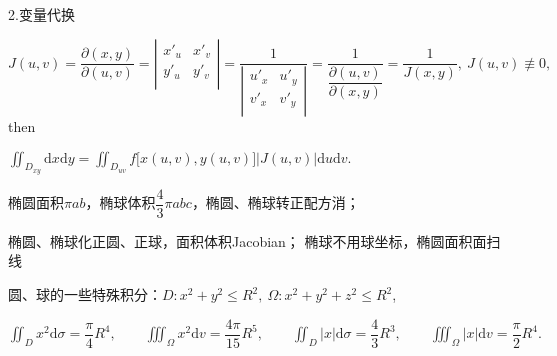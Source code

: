 \documentclass[UTF8]{ctexart}
\newcommand\dif{\mathrm{d}}
\newcommand\no{\noindent}
\newcommand\dis{\displaystyle}
\newcommand\ls{\leqslant}
\begin{document}
\begin{spacing}{2}
\begin{enumerate}[itemindent=1.4em, label=(\arabic*)]
\end{enumerate}

\no2.变量代换

$\dis J(u,v)=\dfrac{\partial(x,y)}{\partial(u,v)}=
\left|\begin{array}{cc} 
    x'_u &    x'_v\\ 
    y'_u &    y'_v\\  
\end{array}\right|
=\dfrac{1}
{\left|\begin{array}{cc} 
    u'_x &    u'_y\\ 
    v'_x &    v'_y\\  
\end{array}\right|}
=\dfrac{1}{\dfrac{\partial(u,v)}{\partial(x,y)}}
=\dfrac{1}{J(x,y)},\ 
 J(u,v)\not\equiv0,\ $then

\vspace{0.2cm}

\centerline{$\dis\iint_{D_{xy}}\dif x\dif y
=\iint_{D_{uv}}f\big[x(u,v),y(u,v)\big]\big|J(u,v)\big|\dif u\dif v.$}


%

\vspace{0.3cm}

椭圆面积$\pi ab$，椭球体积$\dfrac{4}{3}\pi abc$，椭圆、椭球转正配方消；

椭圆、椭球化正圆、正球，面积体积Jacobian；
椭球不用球坐标，椭圆面积面扫线

圆、球的一些特殊积分：$D:x^2+y^2\ls R^2,\ \Omega:x^2+y^2+z^2\ls R^2$,

$\dis\iint_D x^2\dif \sigma=\dfrac{\pi }{4}R^4,
\qquad
\dis\iiint_\Omega x^2\dif v=\dfrac{4\pi}{15}R^5,
\qquad
\dis\iint_D |x|\dif \sigma=\dfrac{4}{3}R^3,
\qquad
\dis\iiint_\Omega |x|\dif v=\dfrac{\pi}{2}R^4.$


\end{spacing}
\end{document}

